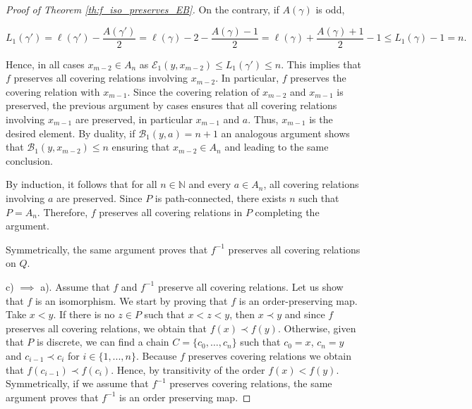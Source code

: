 \documentclass{article}[12pt]
\theoremstyle{exampstyle}
\theoremstyle{remark}
\newcommand{\N}{\mathbb{N}}
\newcommand{\B}{\mathcal{B}}
\newcommand{\E}{\mathcal{E}}
\newcommand{\tuple}[3][1]{#2_{#1}, \dots , #2_{#3}}
\begin{document}
\begin{proof}[Proof of Theorem \ref{th:f_iso_preserves_EB}]
    On the contrary, if  $A(\gamma)$ is odd,

     \[L_1(\gamma') = \ell(\gamma') - \frac{A(\gamma')}{2} =   \ell(\gamma) - 2 - \frac{A(\gamma) - 1}{2} = \ell(\gamma) + \frac{A(\gamma) + 1}{2} - 1 \leq L_1(\gamma) - 1 = n.\]

    Hence, in all cases $x_{m-2} \in A_n$ as $\E_1(y,x_{m-2}) \leq L_1(\gamma') \leq n$. This implies that $f$ preserves all covering relations involving $x_{m-2}$. In particular, $f$ preserves the covering relation with $x_{m-1}$.  Since the covering relation of $x_{m-2}$ and $x_{m-1}$ is preserved, the previous argument by cases ensures that all covering relations involving $x_{m-1}$ are preserved, in particular $x_{m-1}$ and $a$. Thus, $x_{m-1}$ is the desired element. By duality, if $\B_1(y,a) = n+1$ an analogous argument shows that $\B_1(y,x_{m-2}) \leq n$ ensuring that $x_{m-2} \in A_n$ and leading to the same conclusion.

    By induction, it follows that for all $n \in \N$ and every $ a \in A_n$, all covering relations involving $a$ are preserved. Since $P$ is path-connected, there exists $n$ such that $P = A_n$.  Therefore, $f$ preserves all covering relations in $P$ completing the argument.

    Symmetrically, the same argument proves that $f^{-1}$ preserves all covering relations on $Q$.
    
    c) $\implies$ a). Assume that $f$ and $f^{-1}$ preserve all covering relations. Let us show that $f$ is an isomorphism. We start by proving that $f$ is an order-preserving map.  Take $x < y $. If there is no $z \in P$ such that $x < z < y$, then $x \prec y$ and since $f$ preserves all covering relations, we obtain that $f(x) \prec f(y)$. Otherwise,  given that $P$ is discrete, we can find a chain $C = \{\tuple[0]{c}{n}\}$ such that $c_0 = x$, $c_n = y$ and $c_{i-1} \prec c_i$ for $i \in \{ 1, ..., n\}$. Because $f$ preserves covering relations we obtain that $f(c_{i-1}) \prec f(c_i)$. Hence, by transitivity of the order $f(x) < f(y)$. Symmetrically, if we assume that $f^{-1}$ preserves covering relations, the same argument proves that $f^{-1}$ is an order preserving map. 
\end{proof}
\end{document}
